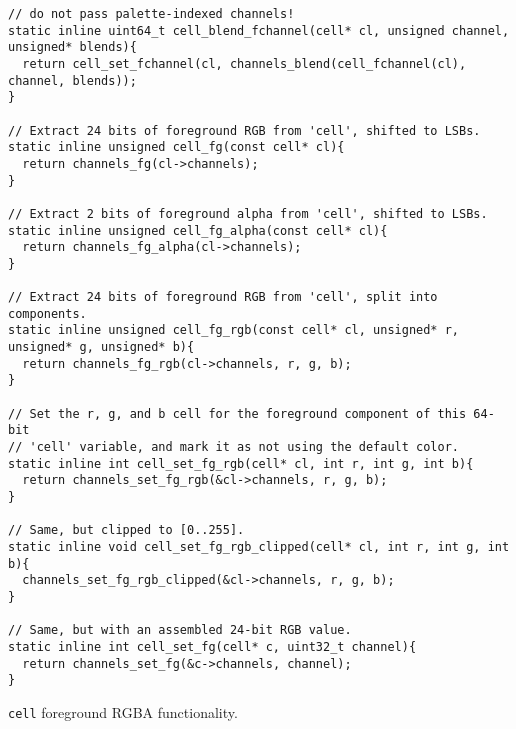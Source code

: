 \begin{listing}[!htb]
\begin{verbatim}
// do not pass palette-indexed channels!
static inline uint64_t cell_blend_fchannel(cell* cl, unsigned channel, unsigned* blends){
  return cell_set_fchannel(cl, channels_blend(cell_fchannel(cl), channel, blends));
}

// Extract 24 bits of foreground RGB from 'cell', shifted to LSBs.
static inline unsigned cell_fg(const cell* cl){
  return channels_fg(cl->channels);
}

// Extract 2 bits of foreground alpha from 'cell', shifted to LSBs.
static inline unsigned cell_fg_alpha(const cell* cl){
  return channels_fg_alpha(cl->channels);
}

// Extract 24 bits of foreground RGB from 'cell', split into components.
static inline unsigned cell_fg_rgb(const cell* cl, unsigned* r, unsigned* g, unsigned* b){
  return channels_fg_rgb(cl->channels, r, g, b);
}

// Set the r, g, and b cell for the foreground component of this 64-bit
// 'cell' variable, and mark it as not using the default color.
static inline int cell_set_fg_rgb(cell* cl, int r, int g, int b){
  return channels_set_fg_rgb(&cl->channels, r, g, b);
}

// Same, but clipped to [0..255].
static inline void cell_set_fg_rgb_clipped(cell* cl, int r, int g, int b){
  channels_set_fg_rgb_clipped(&cl->channels, r, g, b);
}

// Same, but with an assembled 24-bit RGB value.
static inline int cell_set_fg(cell* c, uint32_t channel){
  return channels_set_fg(&c->channels, channel);
}
\end{verbatim}
\caption{\texttt{cell} foreground RGBA functionality.}
\label{listing:cellrgbfg}
\end{listing}

